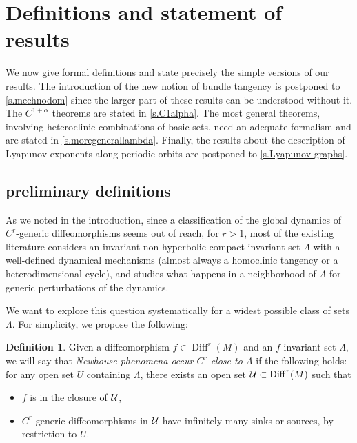\documentclass[11pt, a4paper]{amsart}
\theoremstyle{plain}
\theoremstyle{definition}
\newtheorem{definition}{Definition}[proposition]
\theoremstyle{remark}
\numberwithin{equation}{section}         %
\DeclareMathOperator{\Diff}{{Diff}}
\def\Diff{\operatorname{Diff}}
\begin{document}
\section{Definitions and statement of results}\label{s.defsandstatements}
We now give formal definitions and state precisely the simple versions of our results. The introduction of the new notion of bundle tangency is postponed to \cref{s.mechnodom} since the larger part of these results can be understood without it. The $C^{1+\alpha}$ theorems are stated in \cref{s.C1alpha}.
 The most general theorems, involving heteroclinic combinations of basic sets, need an adequate formalism and are stated in \cref{s.moregenerallambda}. Finally, the results about the description of Lyapunov exponents along periodic orbits are postponed to \cref{s.Lyapunov graphs}.






\subsection{preliminary definitions}\label{s.preldef}

As we noted in the introduction, since a  classification of the global dynamics of $C^r$-generic diffeomorphisms seems out of reach, for $r>1$, most of the existing literature considers an invariant non-hyperbolic compact invariant set $\Lambda$ with a well-defined dynamical mechanisms (almost always a homoclinic tangency or a heterodimensional cycle), and studies what happens in a neighborhood of $\Lambda$ for generic perturbations of the dynamics.

We want to explore this question systematically for a widest possible class of sets $\Lambda$.
For simplicity, we propose the following:

\begin{definition}
Given a diffeomorphism $f\in \Diff^r(M)$ and an $f$-invariant set $\Lambda$, we will say that {\em Newhouse phenomena occur $C^r$-close to $\Lambda$} if the following holds:  for any open set $U$ containing $\Lambda$, there exists an open set $\cU\subset \Diff^r(M)$ such that 
\begin{itemize}
\item  $f$ is in the closure of ${\mathcal U}$,
\item $C^r$-generic diffeomorphisms in ${\mathcal U}$ have infinitely many sinks or sources, by restriction to $U$.
\end{itemize}
\end{definition}
\end{document}
